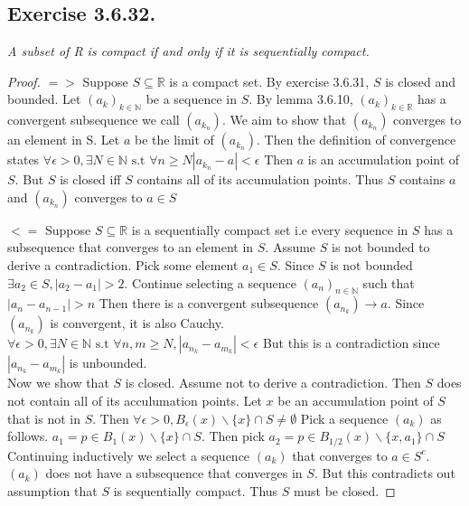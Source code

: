\documentclass[12pt, a4paper]{article}
\newcommand{\mbr}{\mathbb{R}}
\newcommand{\mbn}{\mathbb{N}}
\newcommand {\ep}{\epsilon}
\newcommand {\st}{\text{ s.t }}
\begin{document}
\subsection*{Exercise 3.6.32.}
    \textit{A subset of R is compact if and only if it is sequentially
    compact.}
    \begin{proof}
        $=>$ Suppose $S\subseteq \mbr$ is a compact set. By exercise 3.6.31, $S$ is closed and bounded. 
        Let $(a_k)_{k \in \mbn}$ be a sequence in $S$. By lemma 3.6.10, $(a_k)_{k\in \mbr}$ has a convergent subsequence we call $(a_{k_n})$.
        We aim to show that $(a_{k_n})$ converges to an element in S. Let $a$ be the limit of $(a_{k_n})$. 
        Then the definition of convergence states $\forall \ep > 0, \exists N \in \mbn \st \forall n \ge N |a_{k_n}-a| < \ep$
        Then $a$ is an accumulation point of $S$. But $S$ is closed iff $S$ contains all of its accumulation points. 
        Thus $S$ contains $a$ and $(a_{k_n})$ converges to $a\in S$
        
        $<=$ Suppose $S\subseteq \mbr$ is a sequentially compact set i.e every sequence in $S$ has a subsequence that converges to an element in $S$.
        Assume $S$ is not bounded to derive a contradiction. Pick some element $a_1 \in S$. Since $S$ is not bounded
        $\exists a_2 \in S, |a_2 - a_1| > 2$. Continue selecting a sequence $(a_n)_{n\in \mbn}$ such that $|a_n - a_{n-1}| > n$
        Then there is a convergent subsequence $(a_{n_k}) \rightarrow a$. Since $(a_{n_k})$ is convergent, it is also Cauchy. 
        $\forall \ep >0 ,\exists N \in \mbn \st \forall n,m \ge N, |a_{n_k} - a_{m_k}| < \ep$ 
        But this is a contradiction since $|a_{n_k} - a_{m_k}|$ is unbounded. \\
        Now we show that $S$ is closed. Assume not to derive a contradiction. Then $S$ does not contain all of its acculumation points. 
        Let $x$ be an accumulation point of $S$ that is not in $S$. Then $\forall \ep > 0, B_{\ep}(x)\backslash \{x\} \cap S \not = \emptyset$
        Pick a sequence $(a_k)$ as follows. $a_1 = p\in B_{1}(x)\backslash \{x\} \cap S$. Then pick $a_2 = p\in B_{1/2}(x)\backslash \{x, a_1\} \cap S$
        Continuing inductively we select a sequence $(a_k)$ that converges to $a\in S^c$. $(a_k)$ does not have a subsequence that converges in $S$. 
        But this contradicts out assumption that $S$ is sequentially compact. Thus $S$ must be closed. 


    \end{proof}
\end{document}
